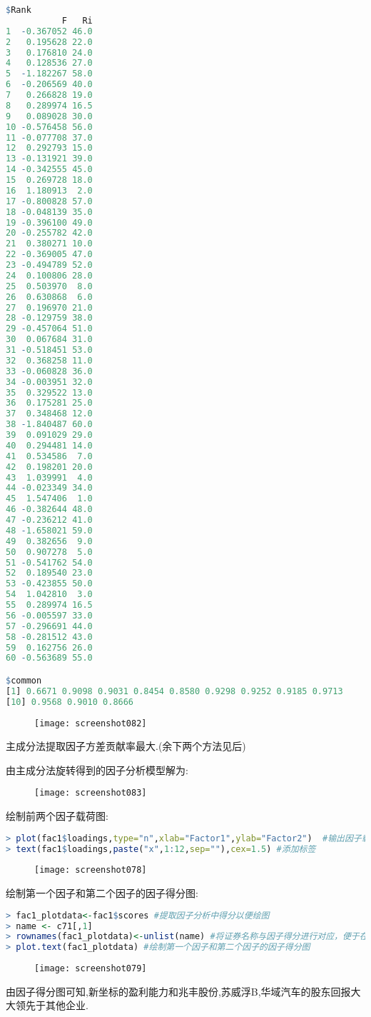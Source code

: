 \documentclass[11pt,a4paper,oneside]{book}
\begin{document}
\begin{lstlisting}[language=r]
$Rank
           F   Ri
1  -0.367052 46.0
2   0.195628 22.0
3   0.176810 24.0
4   0.128536 27.0
5  -1.182267 58.0
6  -0.206569 40.0
7   0.266828 19.0
8   0.289974 16.5
9   0.089028 30.0
10 -0.576458 56.0
11 -0.077708 37.0
12  0.292793 15.0
13 -0.131921 39.0
14 -0.342555 45.0
15  0.269728 18.0
16  1.180913  2.0
17 -0.800828 57.0
18 -0.048139 35.0
19 -0.396100 49.0
20 -0.255782 42.0
21  0.380271 10.0
22 -0.369005 47.0
23 -0.494789 52.0
24  0.100806 28.0
25  0.503970  8.0
26  0.630868  6.0
27  0.196970 21.0
28 -0.129759 38.0
29 -0.457064 51.0
30  0.067684 31.0
31 -0.518451 53.0
32  0.368258 11.0
33 -0.060828 36.0
34 -0.003951 32.0
35  0.329522 13.0
36  0.175281 25.0
37  0.348468 12.0
38 -1.840487 60.0
39  0.091029 29.0
40  0.294481 14.0
41  0.534586  7.0
42  0.198201 20.0
43  1.039991  4.0
44 -0.023349 34.0
45  1.547406  1.0
46 -0.382644 48.0
47 -0.236212 41.0
48 -1.658021 59.0
49  0.382656  9.0
50  0.907278  5.0
51 -0.541762 54.0
52  0.189540 23.0
53 -0.423855 50.0
54  1.042810  3.0
55  0.289974 16.5
56 -0.005597 33.0
57 -0.296691 44.0
58 -0.281512 43.0
59  0.162756 26.0
60 -0.563689 55.0

$common
[1] 0.6671 0.9098 0.9031 0.8454 0.8580 0.9298 0.9252 0.9185 0.9713
[10] 0.9568 0.9010 0.8666
\end{lstlisting}

\begin{figure}[H]
	\centering
	\texttt{[image: screenshot082]}
\end{figure}
主成分法提取因子方差贡献率最大.(余下两个方法见后)

由主成分法旋转得到的因子分析模型解为:
\begin{figure}[H]
	\centering
	\texttt{[image: screenshot083]}
\end{figure}

绘制前两个因子载荷图:
\begin{lstlisting}[language=r]
> plot(fac1$loadings,type="n",xlab="Factor1",ylab="Factor2")  #输出因子载荷图
> text(fac1$loadings,paste("x",1:12,sep=""),cex=1.5) #添加标签
\end{lstlisting}
\begin{figure}[H]
	\centering
	\texttt{[image: screenshot078]}
\end{figure}

绘制第一个因子和第二个因子的因子得分图:
\begin{lstlisting}[language=r]
> fac1_plotdata<-fac1$scores #提取因子分析中得分以便绘图
> name <- c71[,1]
> rownames(fac1_plotdata)<-unlist(name) #将证券名称与因子得分进行对应，便于在图形上绘制标签
> plot.text(fac1_plotdata) #绘制第一个因子和第二个因子的因子得分图
\end{lstlisting}
\begin{figure}[H]
	\centering
	\texttt{[image: screenshot079]}
\end{figure}
由因子得分图可知,新坐标的盈利能力和兆丰股份,苏威浮B,华域汽车的股东回报大大领先于其他企业.
\end{document}
